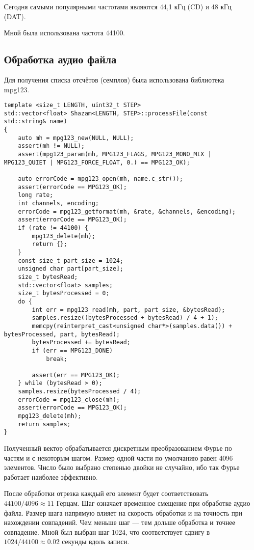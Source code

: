 \documentclass[12pt]{article}
\newcommand{\lst}[2]{
	\subsection*{\textbf{#2}}
	{\footnotesize
	
	}
}
\begin{document}
Сегодня самыми популярными частотами являются 44,1 кГц (CD) и 48 кГц (DAT).

Мной была использована частота 44100.

\subsection*{Обработка аудио файла}

Для получения списка отсчётов (семплов) была использована библиотека mpg123.

\begin{lstlisting}
template <size_t LENGTH, uint32_t STEP>
std::vector<float> Shazam<LENGTH, STEP>::processFile(const std::string& name)
{
	auto mh = mpg123_new(NULL, NULL);
	assert(mh != NULL);
	assert(mpg123_param(mh, MPG123_FLAGS, MPG123_MONO_MIX | MPG123_QUIET | MPG123_FORCE_FLOAT, 0.) == MPG123_OK);

	auto errorCode = mpg123_open(mh, name.c_str());
	assert(errorCode == MPG123_OK);
	long rate;
	int channels, encoding;
	errorCode = mpg123_getformat(mh, &rate, &channels, &encoding);
	assert(errorCode == MPG123_OK);
	if (rate != 44100) {
		mpg123_delete(mh);
		return {};
	}
	const size_t part_size = 1024;
	unsigned char part[part_size];
	size_t bytesRead;
	std::vector<float> samples;
	size_t bytesProcessed = 0;
	do {
		int err = mpg123_read(mh, part, part_size, &bytesRead);
		samples.resize((bytesProcessed + bytesRead) / 4 + 1);
		memcpy(reinterpret_cast<unsigned char*>(samples.data()) + bytesProcessed, part, bytesRead);
		bytesProcessed += bytesRead;
		if (err == MPG123_DONE)
			break;

		assert(err == MPG123_OK);
	} while (bytesRead > 0);
	samples.resize(bytesProcessed / 4);
	errorCode = mpg123_close(mh);
	assert(errorCode == MPG123_OK);
	mpg123_delete(mh);
	return samples;
}
\end{lstlisting}

Полученный вектор обрабатывается дискретным преобразованием Фурье по частям и с
некоторым шагом. Размер одной части по умолчанию равен 4096 элементов. Число было выбрано
степенью двойки не случайно, ибо так Фурье работает наиболее эффективно.

После обработки отрезка каждый его элемент будет соответствовать $44100/4096 \approx 11$ Герцам.
Шаг означает временное смещение при обработке аудио файла. Размер шага
напрямую влияет на скорость обработки и на точность при нахождении совпадений.
Чем меньше шаг --- тем дольше обработка и точнее совпадение.
Мной был выбран шаг 1024, что соответствует сдвигу в $1024/44100 \approx 0.02$ секунды
вдоль записи.
\end{document}
